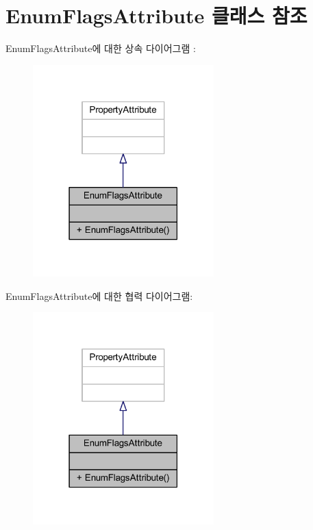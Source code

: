 \hypertarget{class_enum_flags_attribute}{}\section{Enum\+Flags\+Attribute 클래스 참조}
\label{class_enum_flags_attribute}


Enum\+Flags\+Attribute에 대한 상속 다이어그램 \+: 
\nopagebreak
\begin{figure}[H]
\begin{center}
\leavevmode
\includegraphics[width=198pt]{dc/dcf/class_enum_flags_attribute__inherit__graph}
\end{center}
\end{figure}


Enum\+Flags\+Attribute에 대한 협력 다이어그램\+:
\nopagebreak
\begin{figure}[H]
\begin{center}
\leavevmode
\includegraphics[width=198pt]{d2/d34/class_enum_flags_attribute__coll__graph}
\end{center}
\end{figure}
